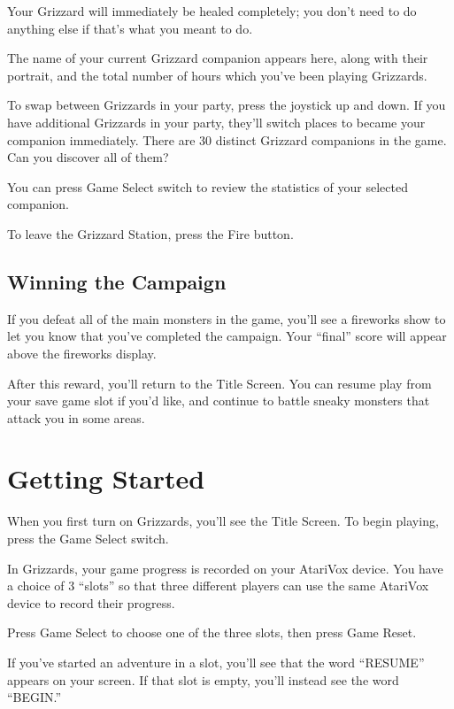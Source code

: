 \documentclass[10pt,twoside,openright]{memoir}
\begin{document}
Your Grizzard will immediately be healed completely; you don't need to do
anything else if that's what you meant to do.

The name  of your  current Grizzard companion  appears here,  along with
their  portrait,  and  the  total  number of  hours  which  you've  been
playing Grizzards.

To swap between Grizzards in your party, press the joystick up and down. If
you have additional Grizzards in your party, they'll switch places to became
your companion immediately. There are 30 distinct Grizzard companions in
the game. Can you discover all of them?

You  can press  Game  Select switch  to review  the  statistics of  your
selected companion.

To leave the Grizzard Station, press the Fire button.


\section{Winning the Campaign}

If you defeat all of the main monsters in the game, you'll see a fireworks
show to let you know that you've completed the campaign. Your ``final''
score will appear above the fireworks display.

After this reward, you'll return to the Title Screen. You can resume play
from your save game slot if you'd like, and continue to battle sneaky
monsters that attack you in some areas.



\chapter{Getting Started}\label{Getting Started}

When you first turn on Grizzards, you'll see the Title
Screen. To begin playing, press the Game Select switch.

In  Grizzards,  your game  progress is  recorded on  your
AtariVox  device. You  have  a choice  of 3  ``slots''  so that  three
different players  can use  the same AtariVox  device to  record their
progress.

Press Game Select to choose one of the three slots, then press Game
Reset.

If you've started an adventure in a slot, you'll see that the word
``RESUME'' appears on your screen. If that slot is empty, you'll
instead see the word ``BEGIN.''
\end{document}
